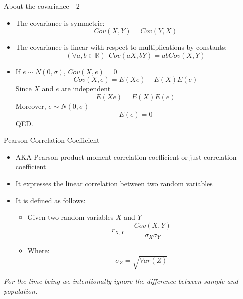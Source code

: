 \documentclass{beamer}
\begin{document}
\begin{frame}
{\centerline{About the covariance - 2}} \label{P:Covariance2}

\begin{itemize}
\item The covariance is symmetric:
 $$Cov(X,Y) = Cov(Y,X)$$
\item The covariance is linear with respect to multiplications by constants:
 $$(\forall a, b \in \mathbb{R}) ~~ Cov(aX,bY) = abCov(X,Y)$$

\item If $e \sim N(0,\sigma)$, $Cov(X,e) = 0$ \\
$$Cov(X,e) =  E(Xe) - E(X)E(e)$$
Since  $X$ and $e$ are independent
$$ E(Xe) = E(X)E(e)$$
Moreover,  $e \sim N(0,\sigma)$
$$E(e) = 0$$
QED.
\end{itemize}


\end{frame}


\begin{frame}
{\centerline{Pearson Correlation Coefficient}} \label{P:Pearson}

\begin{itemize}
\item AKA Pearson product-moment correlation coefficient or just correlation coefficient
\item It expresses the linear correlation between two random variables
\item It is defined as follows:
\begin{itemize}
\item Given two random variables $X$ and $Y$
$$r_{X,Y} = \frac{Cov(X,Y)}{\sigma_X\sigma_Y}$$
\item Where:
$$\sigma_Z = \sqrt{Var(Z)}$$
\end{itemize}
\end{itemize}

\vspace*{0.5cm}

\textit{\small For the time being we intentionally ignore the difference between sample and population.}

\end{frame}
\end{document}
